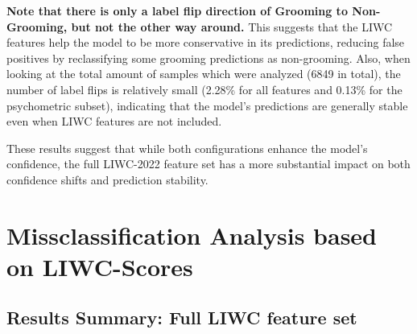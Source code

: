 \textbf{Note that there is only a label flip direction of Grooming to Non-Grooming, but not the other way around.} This suggests that the LIWC features help the model to be more conservative in its predictions, reducing false positives by reclassifying some grooming predictions as non-grooming. Also, when looking at the total amount of samples which were analyzed (6849 in total), the number of label flips is relatively small (2.28\% for all features and 0.13\% for the psychometric subset), indicating that the model's predictions are generally stable even when LIWC features are not included.

These results suggest that while both configurations enhance the model's confidence, the full LIWC-2022 feature set has a more substantial impact on both confidence shifts and prediction stability.

\section{Missclassification Analysis based on LIWC-Scores} \label{sec:misclassification_analysis}


\subsection{Results Summary: Full LIWC feature set}



